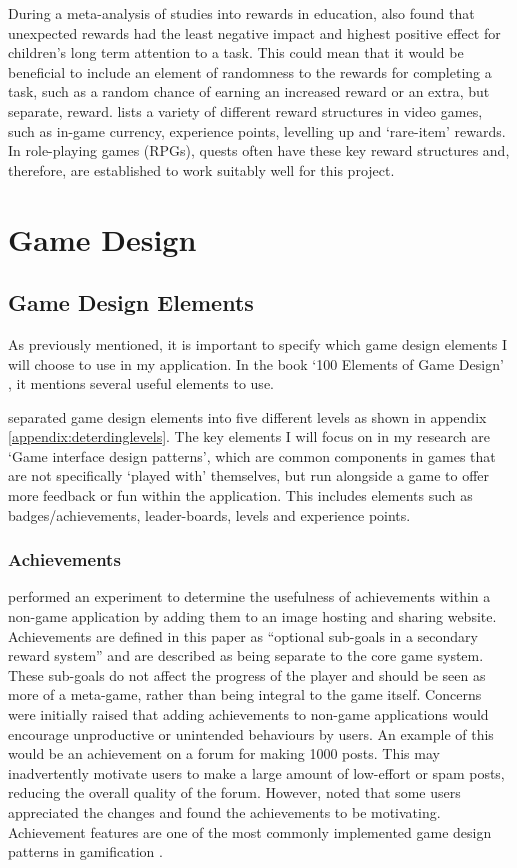 During a meta-analysis of studies into rewards in education, \cite{deci2001extrinsic} also found that unexpected rewards had the least negative impact and highest positive effect for children's long term attention to a task. 
This could mean that it would be beneficial to include an element of randomness to the rewards for completing a task, such as a random chance of earning an increased reward or an extra, but separate, reward.
\cite{king2010video} lists a variety of different reward structures in video games, such as in-game currency, experience points, levelling up and `rare-item' rewards. 
In role-playing games (RPGs), quests often have these key reward structures and, therefore, are established to work suitably well for this project.

\section{Game Design}
\subsection{Game Design Elements}
As previously mentioned, it is important to specify which game design elements I will choose to use in my application.
In the book `100 Elements of Game Design' \citep{despain2012100}, it mentions several useful elements to use.

\cite{Deterding:2011:GDE:2181037.2181040} separated game design elements into five different levels as shown in appendix \ref{appendix:deterdinglevels}.
The key elements I will focus on in my research are `Game interface design patterns', which are common components in games that are not specifically `played with' themselves, but run alongside a game to offer more feedback or fun within the application.
This includes elements such as badges/achievements, leader-boards, levels and experience points. 

\subsubsection{Achievements}
\cite{Montola:2009:AGA:1621841.1621859} performed an experiment to determine the usefulness of achievements within a non-game application by adding them to an image hosting and sharing website.
Achievements are defined in this paper as ``optional sub-goals in a secondary reward system'' and are described as being separate to the core game system.
These sub-goals do not affect the progress of the player and should be seen as more of a meta-game, rather than being integral to the game itself.
Concerns were initially raised that adding achievements to non-game applications would encourage unproductive or unintended behaviours by users. An example of this would be an achievement on a forum for making 1000 posts. This may inadvertently motivate users to make a large amount of low-effort or spam posts, reducing the overall quality of the forum.
However, \cite{Montola:2009:AGA:1621841.1621859} noted that some users appreciated the changes and found the achievements to be motivating.
Achievement features are one of the most commonly implemented game design patterns in gamification \citep{hamari2011framework}. 

